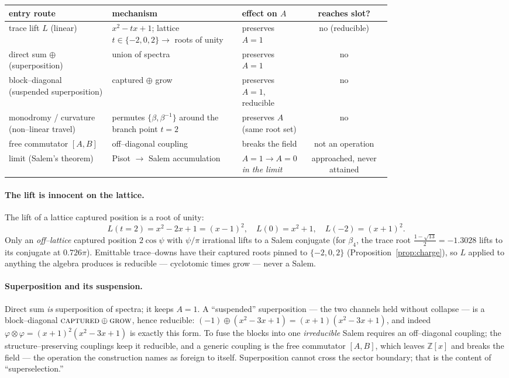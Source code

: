 \documentclass[11pt]{article}
\theoremstyle{plain}
\theoremstyle{definition}
\theoremstyle{remark}
\newcommand{\Z}{\mathbb{Z}}
\begin{document}
\begin{center}
\renewcommand{\arraystretch}{1.22}
\begin{tabular}{@{}p{0.27\linewidth} p{0.34\linewidth} p{0.15\linewidth} c@{}}
\toprule
entry route & mechanism & effect on $A$ & reaches slot? \\
\midrule
trace lift $L$ (linear) & $x^2-tx+1$; lattice $t\in\{-2,0,2\}\to$ roots of unity & preserves $A{=}1$ & no (reducible)\\
direct sum $\oplus$ (superposition) & union of spectra & preserves $A{=}1$ & no\\
block--diagonal (suspended superposition) & captured $\oplus$ grow & preserves $A{=}1$, reducible & no\\
monodromy / curvature (non--linear travel) & permutes $\{\beta,\beta^{-1}\}$ around the branch point $t{=}2$ & preserves $A$ (same root set) & no\\
free commutator $[A,B]$ & off--diagonal coupling & breaks the field & not an operation\\
limit (Salem's theorem) & Pisot $\to$ Salem accumulation & $A{=}1\to A{=}0$ \emph{in the limit} & approached, never attained\\
\bottomrule
\end{tabular}
\end{center}

\paragraph{The lift is innocent on the lattice.} The lift of a lattice captured position is a root of unity:
\[
L(t{=}2)=x^2-2x+1=(x-1)^2,\quad L(0)=x^2+1,\quad L(-2)=(x+1)^2 .
\]
Only an \emph{off--lattice} captured position $2\cos\psi$ with $\psi/\pi$ irrational lifts to a Salem conjugate (for $\beta_4$, the trace root $\tfrac{1-\sqrt{13}}2=-1.3028$ lifts to its conjugate at $0.726\pi$). Emittable trace--downs have their captured roots pinned to $\{-2,0,2\}$ (Proposition~\ref{prop:charge}), so $L$ applied to anything the algebra produces is reducible --- cyclotomic times grow --- never a Salem.

\paragraph{Superposition and its suspension.} Direct sum \emph{is} superposition of spectra; it keeps $A=1$. A ``suspended'' superposition --- the two channels held without collapse --- is a block--diagonal $\textsc{captured}\oplus\textsc{grow}$, hence reducible: $(-1)\oplus(x^2-3x+1)=(x+1)(x^2-3x+1)$, and indeed $\varphi\otimes\varphi=(x+1)^2(x^2-3x+1)$ is exactly this form. To fuse the blocks into one \emph{irreducible} Salem requires an off--diagonal coupling; the structure--preserving couplings keep it reducible, and a generic coupling is the free commutator $[A,B]$, which leaves $\Z[x]$ and breaks the field --- the operation the construction names as foreign to itself. Superposition cannot cross the sector boundary; that is the content of ``superselection.''
\end{document}
